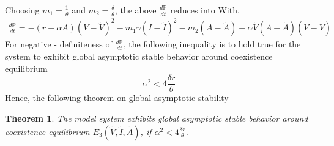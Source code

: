 \documentclass[12pt]{article}
\newtheorem{theorem}{Theorem}[section]
\numberwithin{equation}{section}
\begin{document}
Choosing $m_1 = \frac{1}{\theta}$ and $m_2 = \frac{\delta}{\theta}$, the above $\frac{d \mathbb P}{dt}$ reduces into
With,
\begin{equation}\label{sec3:e42}
\begin{split}
\frac{d\mathbb P}{dt} = -(r+\alpha A)(V-\tilde V)^2 - m_1\gamma(I-\tilde I)^2 - m_2(A-\tilde A)-\alpha \tilde V(A-\tilde A)(V-\tilde V)
\end{split}
\end{equation}
For negative - definiteness of $\frac{d \mathbb P}{dt}$, the following inequality is to hold true for the system to exhibit global asymptotic stable behavior around coexistence equilibrium
\begin{equation}
\alpha^2<4\frac{\delta r}{\theta}  
\end{equation}
Hence, the following theorem on global asymptotic stability
\begin{theorem}\label{Theorem 3.5}
The model system exhibits global asymptotic stable behavior around coexistence equilibrium $E_3(\tilde V,\tilde I,\tilde A)$, if $\alpha^2<4\frac{\delta r}{\theta}$.
\end{theorem}
\end{document}

